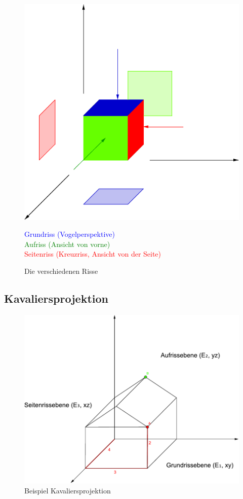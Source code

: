 \documentclass[12pt,a4paper]{scrbook}
\begin{document}
\begin{figure}[h]
  \centering
  \includegraphics[scale=1]{img/DGeinfuehrung.pdf}
  \caption{Die verschiedenen Risse}
  \textcolor{blue}{Grundriss (Vogelperspektive)}\\
  \textcolor{green}{Aufriss (Ansicht von vorne)}\\
  \textcolor{red}{Seitenriss (Kreuzriss, Ansicht von der Seite)}
\end{figure}


\subsection{Kavaliersprojektion}
\begin{figure}[h]
  \centering
  \includegraphics[scale=0.8]{img/DGeinfuehrung_2.pdf}
  \caption{Beispiel Kavaliersprojektion}
\end{figure}
\end{document}
